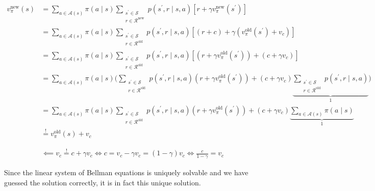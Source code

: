 \begin{solution}
\begin{enumerate}[label = \arabic*.]
    \begin{align*}
        v_\pi^\text{new}(s)
        & =
        \sum_{a \in \mathcal A(s)}
            \pi(a \mid s)
            \sum_{\substack{s^\prime \in \mathcal S \\ r \in \mathcal R^\text{new}}}
                p(s^\prime, r \mid s, a)
                [r + \gamma v_\pi^\text{new}(s^\prime)] \\
        & =
        \sum_{a \in \mathcal A(s)}
            \pi(a \mid s)
            \sum_{\substack{s^\prime \in \mathcal S \\ r \in \mathcal R^\text{old}}}
                p(s^\prime, r \mid s, a)
                [(r + c) + \gamma (v_\pi^\text{old}(s^\prime) + v_c)] \\
        & =
        \sum_{a \in \mathcal A(s)}
            \pi(a \mid s)
            \sum_{\substack{s^\prime \in \mathcal S \\ r \in \mathcal R^\text{old}}}
                p(s^\prime, r \mid s, a)
                [(r + \gamma v_\pi^\text{old}(s^\prime)) + (c + \gamma v_c)] \\
        & =
        \sum_{a \in \mathcal A(s)}
            \pi(a \mid s)
            \Bigg (
                \sum_{\substack{s^\prime \in \mathcal S \\ r \in \mathcal R^\text{old}}}
                    p(s^\prime, r \mid s, a)
                    (r + \gamma v_\pi^\text{old}(s^\prime))
                +
                (c + \gamma v_c)
                \underbrace
                {
                    \sum_{\substack{s^\prime \in \mathcal S \\ r \in \mathcal R^\text{old}}}
                        p(s^\prime, r \mid s, a)
                }_1
            \Bigg ) \\
        & =
        \sum_{a \in \mathcal A(s)}
            \pi(a \mid s)
            \sum_{\substack{s^\prime \in \mathcal S \\ r \in \mathcal R^\text{old}}}
                p(s^\prime, r \mid s, a)
                (r + \gamma v_\pi^\text{old}(s^\prime))
        +
        (c + \gamma v_c)
        \underbrace
        {
            \sum_{a \in \mathcal A(s)}
                \pi(a \mid s)
        }_1 \\
        & \stackrel{!}{=}
        v_\pi^\text{old}(s) + v_c
    \end{align*}

    \begin{align*}
        \impliedby
        v_c \stackrel{!}{=} c + \gamma v_c
        \iff
        c = v_c - \gamma v_c = (1 - \gamma) v_c
        \iff
        \frac{c}{1 - \gamma} = v_c
    \end{align*}

    Since the linear system of Bellman equations is uniquely solvable and we have guessed the solution correctly, it is in fact this unique solution.

\end{enumerate}

\end{solution}

